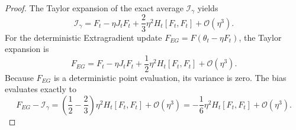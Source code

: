 \documentclass[letter,11pt]{article}
\begin{document}
\begin{proof}
The Taylor expansion of the exact average $\mathcal{I}_{\gamma}$ yields
\begin{equation}
\mathcal{I}_{\gamma} = F_t - \eta J_t F_t + \frac{2}{3}\eta^2 H_t[F_t, F_t] + \mathcal{O}(\eta^3).
\end{equation}
For the deterministic Extragradient update $F_{EG} = F(\theta_t - \eta F_t)$, the Taylor expansion is
\begin{equation}
F_{EG} = F_t - \eta J_t F_t + \frac{1}{2}\eta^2 H_t[F_t, F_t] + \mathcal{O}(\eta^3).
\end{equation}
Because $F_{EG}$ is a deterministic point evaluation, its variance is zero. The bias evaluates exactly to
\begin{equation}
F_{EG} - \mathcal{I}_{\gamma} = \left(\frac{1}{2} - \frac{2}{3}\right)\eta^2 H_t[F_t, F_t] + \mathcal{O}(\eta^3) = -\frac{1}{6}\eta^2 H_t[F_t, F_t] + \mathcal{O}(\eta^3).
\end{equation}


\end{proof}
\end{document}
